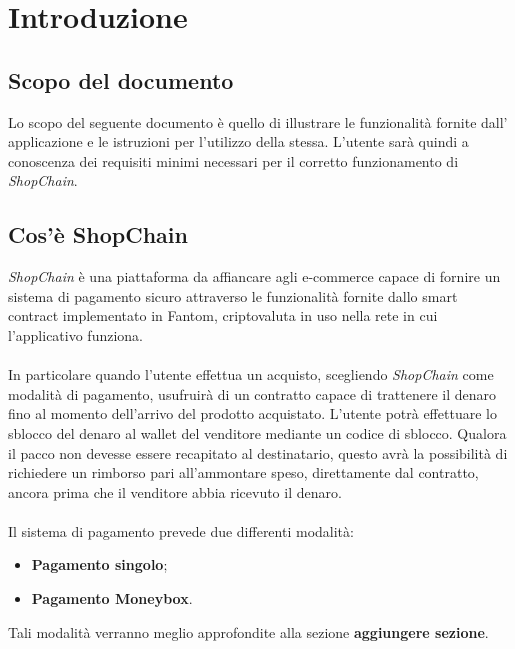 \section{Introduzione}\label{section:introduzione}

\subsection{Scopo del documento}
Lo scopo del seguente documento è quello di illustrare le funzionalità fornite dall' applicazione e le istruzioni per l'utilizzo della stessa.
L'utente sarà quindi a conoscenza dei requisiti minimi necessari per il corretto funzionamento di \textit{ShopChain}.

\subsection{Cos'è ShopChain}
\textit{ShopChain} è una piattaforma da affiancare agli e-commerce\glo{} capace di fornire un sistema di pagamento sicuro attraverso le funzionalità fornite dallo smart contract\glo{} implementato in Fantom\glo{}, criptovaluta\glo{} in uso nella rete in cui l'applicativo funziona.\\\\
In particolare quando l'utente effettua un acquisto, scegliendo \textit{ShopChain} come modalità di pagamento, usufruirà di un contratto capace di trattenere il denaro fino al momento dell'arrivo del prodotto acquistato. L'utente potrà effettuare lo sblocco  del denaro al wallet\glo{} del venditore mediante un codice di sblocco. Qualora il pacco non devesse essere recapitato al destinatario, questo avrà la possibilità di richiedere un rimborso pari all'ammontare speso, direttamente dal contratto, ancora prima che il venditore abbia ricevuto il denaro.\\\\
Il sistema di pagamento prevede due differenti modalità:
\begin{itemize}
    \item \textbf{Pagamento singolo};
    \item  \textbf{Pagamento Moneybox}.
\end{itemize}
Tali modalità verranno meglio approfondite alla sezione \textbf{aggiungere sezione}.

